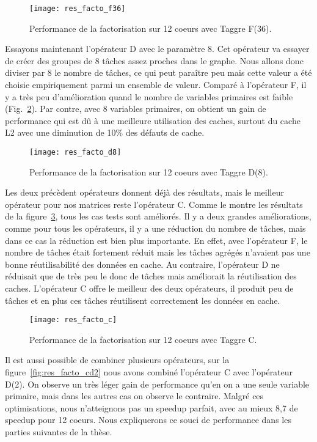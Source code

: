 \begin{figure}[t!]
  \centering
  \texttt{[image: res\_facto\_f36]}
  \caption{Performance de la factorisation sur 12 coeurs avec Taggre F(36).}
  \label{fig:res_facto_f36}
\end{figure}

Essayons maintenant l'opérateur D avec le paramètre 8.
%
Cet opérateur va essayer de créer des groupes de 8 tâches assez proches dans le graphe.
%
Nous allons donc diviser par 8 le nombre de tâches, ce qui peut paraître peu mais cette valeur a été choisie empiriquement parmi un ensemble de valeur.
%
Comparé à l'opérateur F, il y a très peu d'amélioration quand le nombre de variables primaires est faible (Fig.~\ref{fig:res_facto_d8}).
%
Par contre, avec 8 variables primaires, on obtient un gain de performance qui est dû à une meilleure utilisation des caches, surtout du cache L2 avec une diminution de 10\% des défauts de cache.

\begin{figure}[t!]
  \centering
  \texttt{[image: res\_facto\_d8]}
  \caption{Performance de la factorisation sur 12 coeurs avec Taggre D(8).}
  \label{fig:res_facto_d8}
\end{figure}

Les deux précèdent opérateurs donnent déjà des résultats, mais le meilleur opérateur pour nos matrices reste l'opérateur C.
%
Comme le montre les résultats de la figure~\ref{fig:res_facto_c}, tous les cas tests sont améliorés.
%
Il y a deux grandes améliorations, comme pour tous les opérateurs, il y a une réduction du nombre de tâches, mais dans ce cas la réduction est bien plus importante.
%
En effet, avec l'opérateur F, le nombre de tâches était fortement réduit mais les tâches agrégés n'avaient pas une bonne réutilisabilité des données en cache.
%
Au contraire, l'opérateur D ne réduisait que de très peu le donc de tâches mais améliorait la réutilisation des caches.
%
L'opérateur C offre le meilleur des deux opérateurs, il produit peu de tâches et en plus ces tâches réutilisent correctement les données en cache.


\begin{figure}[t!]
  \centering
  \texttt{[image: res\_facto\_c]}
  \caption{Performance de la factorisation sur 12 coeurs avec Taggre C.}
  \label{fig:res_facto_c}
\end{figure}

Il est aussi possible de combiner plusieurs opérateurs, sur la figure~\ref{fig:res_facto_cd2} nous avons combiné l'opérateur C avec l'opérateur D(2).
%
On observe un très léger gain de performance qu'en on a une seule variable primaire, mais dans les autres cas on observe le contraire.
%
Malgré ces optimisations, nous n'atteignons pas un speedup parfait, avec au mieux 8,7 de speedup pour 12 coeurs.
%
Nous expliquerons ce souci de performance dans les parties suivantes de la thèse.

